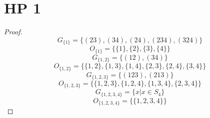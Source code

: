 \documentclass{article}
\begin{document}
\section{HP 1}
\begin{proof}
\[
G_{\{1\}} = \{(23),(34),(24),(234),(324)\}
\]
\[
O_{\{1\}} = \{\{1\},\{2\},\{3\},\{4\}\}
\]
\[
G_{\{1,2\}} = \{(12), (34)\}
\]
\[
O_{\{1,2\}} = \{\{1,2\},\{1,3\},\{1,4\},\{2,3\},\{2,4\},\{3,4\}\}
\]
\[
G_{\{1,2,3\}} = \{(123),(213)\}
\]
\[
O_{\{1,2,3\}} = \{\{1,2,3\},\{1,2,4\},\{1,3,4\},\{2,3,4\}\}
\]
\[
G_{\{1,2,3,4\}} = \{x|x \in S_4\}
\]
\[
O_{\{1,2,3,4\}} = \{\{1,2,3,4\}\}
\]
\end{proof}
\end{document}

